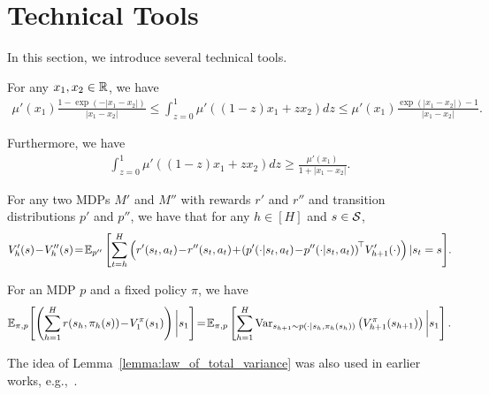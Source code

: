 \section{Technical Tools}

In this section, we introduce several technical tools.

\begin{lemma} \label{lemma:self_concordance}
	For any $x_1,x_2 \in \mathbb{R}$, we have
	\begin{align*}
		\mu'(x_1) \frac{1-\exp(-|x_1-x_2|)}{|x_1-x_2|} \leq \int_{z=0}^{1} \mu'( (1-z)x_1 + zx_2 ) dz \leq \mu'(x_1) \frac{\exp(|x_1-x_2|)-1}{|x_1-x_2|} .
	\end{align*}
	
	Furthermore, we have
	\begin{align*}
		\int_{z=0}^{1} \mu'( (1-z)x_1 + zx_2 ) dz \geq \frac{\mu'(x_1)}{1+|x_1-x_2|} .
	\end{align*}
\end{lemma}

\begin{lemma} \label{lemma:value_diff_lemma}
	For any two MDPs $M'$ and $M''$ with rewards $r'$ and $r''$ and transition distributions $p'$ and $p''$, we have that for any $h \in [H]$ and $s \in \mathcal{S}$,
	\begin{align*}
		V'_h(s) \!-\! V''_h(s) \!=\! \ex_{p''}\mbr{ \sum_{t=h}^{H} \sbr{ r'(s_t,a_t) \!-\! r''(s_t,a_t) \!+\! \sbr{ p'(\cdot|s_t,a_t) \!-\! p''(\cdot|s_t,a_t) }^{\!\top} \! V'_{h+1}(\cdot) } | s_t=s } \!.
	\end{align*}
\end{lemma}

\begin{lemma} \label{lemma:law_of_total_variance}
	For an MDP $p$ and a fixed policy $\pi$, we have
	\begin{align*}
		\mathbb{E}_{\pi,p}\! \left[  \left( \sum_{h=1}^{H} r(s_h,\pi_h(s)) \!-\! V_1^{\pi}(s_1)  \right) \bigg| s_1  \right] \!=\! \mathbb{E}_{\pi,p} \left[  \sum_{h=1}^{H} \textup{Var}_{s_{h+1} \sim p(\cdot|s_h,\pi_h(s_h))}\left( V^{\pi}_{h+1}(s_{h+1}) \right) \bigg| s_1  \right] .
	\end{align*}
\end{lemma}

The idea of Lemma~\ref{lemma:law_of_total_variance} was also used in earlier works, e.g.,~\cite{munos1999influence,lattimore2012pac,gheshlaghi2013minimax}.

